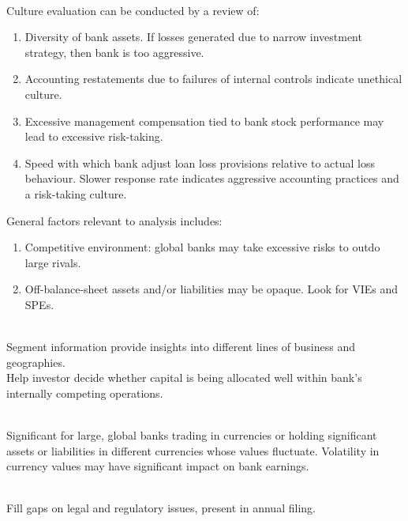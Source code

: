 \begin{remark} \\
Culture evaluation can be conducted by a review of:
\begin{enumerate}[label=\roman*.]
\setlength{\itemsep}{0pt}
\item Diversity of bank assets. If losses generated due to narrow investment strategy, then bank is too aggressive.
\item Accounting restatements due to failures of internal controls indicate unethical culture.
\item Excessive management compensation tied to bank stock performance may lead to excessive risk-taking.
\item Speed with which bank adjust loan loss provisions relative to actual loss behaviour. Slower response rate indicates aggressive accounting practices and a risk-taking culture.
\end{enumerate}
General factors relevant to analysis includes:
\begin{enumerate}[label=\roman*.]
\setlength{\itemsep}{0pt}
\item Competitive environment: global banks may take excessive risks to outdo large rivals.
\item Off-balance-sheet assets and/or liabilities may be opaque. Look for VIEs and SPEs.
\end{enumerate}
\end{remark}

\begin{remark} \\
Segment information provide insights into different lines of business and geographies.\\Help investor decide whether capital is being allocated well within bank’s internally competing operations.
\end{remark}

\begin{remark} \\
Significant for large, global banks trading in currencies or holding significant assets or liabilities in different currencies whose values fluctuate. Volatility in currency values may have significant impact on bank earnings.
\end{remark}

\begin{remark} \\
Fill gaps on legal and regulatory issues, present in annual filing.
\end{remark}

